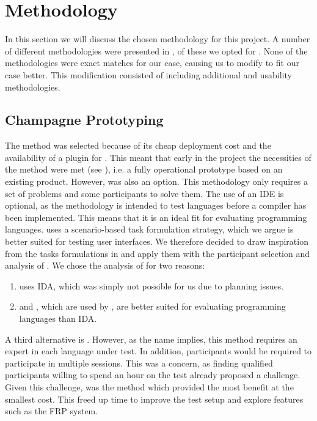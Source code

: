 \section{Methodology}
In this section we will discuss the chosen methodology for this project. A number of different methodologies were presented in , of these we opted for \champagne. None of the methodologies were exact matches for our case, causing us to modify \champagne to fit our case better. This modification consisted of including additional \attentions and \cognitive usability methodologies.

\subsection{Champagne Prototyping}
The \champagne method was selected because of its cheap deployment cost and the availability of a \fs plugin for \unity\cite{fsharp2019plugin}. This meant that early in the project the necessities of the method were met (see ), i.e. a fully operational prototype based on an existing product. However, \discount was also an option. This methodology only requires a set of problems and some participants to solve them. The use of an \gls{IDE} is optional, as the methodology is intended to test languages before a compiler has been implemented. This means that it is an ideal fit for evaluating programming languages. \champagne uses a scenario-based task formulation strategy, which we argue is better suited for testing user interfaces. We therefore decided to draw inspiration from the tasks formulations in \discount and apply them with the participant selection and analysis of \champagne. We chose the analysis of \champagne for two reasons:
\begin{enumerate}
    \item \discount uses \gls{IDA}, which was simply not possible for us due to planning issues.
    \item \cognitive and \attention, which are used by \champagne, are better suited for evaluating programming languages than \gls{IDA}.
\end{enumerate}

A third alternative is \expert. However, as the name implies, this method requires an expert in each language under test. In addition, participants would be required to participate in multiple sessions. This was a concern, as finding qualified participants willing to spend an hour on the test already proposed a challenge. Given this challenge, \champagne was the method which provided the most benefit at the smallest cost. This freed up time to improve the test setup and explore features such as the \gls{FRP} system.

